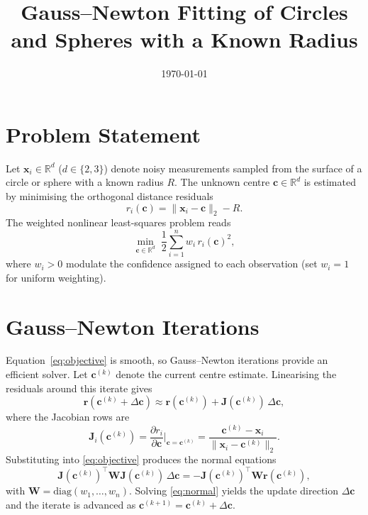 \documentclass[11pt]{article}
\title{Gauss--Newton Fitting of Circles and Spheres with a Known Radius}
\author{}
\date{\today}
\begin{document}
\maketitle

\section{Problem Statement}
Let $\mathbf{x}_i \in \mathbb{R}^d$ ($d \in \{2,3\}$) denote noisy measurements sampled from the surface of a circle or sphere with a known radius $R$. The unknown centre $\mathbf{c} \in \mathbb{R}^d$ is estimated by minimising the orthogonal distance residuals
\begin{equation}
  \label{eq:residuals}
  r_i(\mathbf{c}) = \lVert \mathbf{x}_i - \mathbf{c} \rVert_2 - R.
\end{equation}
The weighted nonlinear least-squares problem reads
\begin{equation}
  \label{eq:objective}
  \min_{\mathbf{c} \in \mathbb{R}^d} \; \frac{1}{2} \sum_{i=1}^n w_i \, r_i(\mathbf{c})^2,
\end{equation}
where $w_i > 0$ modulate the confidence assigned to each observation (set $w_i = 1$ for uniform weighting).

\section{Gauss--Newton Iterations}
Equation~\eqref{eq:objective} is smooth, so Gauss--Newton iterations provide an efficient solver. Let $\mathbf{c}^{(k)}$ denote the current centre estimate. Linearising the residuals around this iterate gives
\begin{equation}
  \mathbf{r}(\mathbf{c}^{(k)} + \Delta \mathbf{c}) \approx \mathbf{r}(\mathbf{c}^{(k)}) + \mathbf{J}(\mathbf{c}^{(k)}) \, \Delta \mathbf{c},
\end{equation}
where the Jacobian rows are
\begin{equation}
  \mathbf{J}_i(\mathbf{c}^{(k)}) = \frac{\partial r_i}{\partial \mathbf{c}}\Big\rvert_{\mathbf{c}=\mathbf{c}^{(k)}} = \frac{\mathbf{c}^{(k)} - \mathbf{x}_i}{\lVert \mathbf{x}_i - \mathbf{c}^{(k)} \rVert_2}.
\end{equation}
Substituting into \eqref{eq:objective} produces the normal equations
\begin{equation}
  \label{eq:normal}
  \mathbf{J}(\mathbf{c}^{(k)})^\top \mathbf{W} \mathbf{J}(\mathbf{c}^{(k)}) \, \Delta \mathbf{c} = - \mathbf{J}(\mathbf{c}^{(k)})^\top \mathbf{W} \mathbf{r}(\mathbf{c}^{(k)}),
\end{equation}
with $\mathbf{W} = \mathrm{diag}(w_1,\dots,w_n)$. Solving \eqref{eq:normal} yields the update direction $\Delta \mathbf{c}$ and the iterate is advanced as $\mathbf{c}^{(k+1)} = \mathbf{c}^{(k)} + \Delta \mathbf{c}$.
\end{document}
